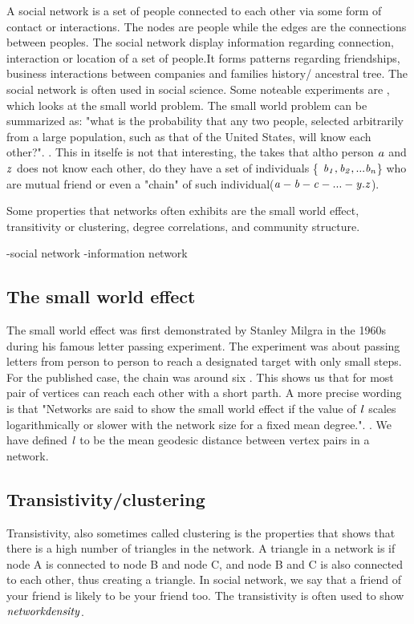 A social network is a set of people connected to each other via some form of contact or interactions\cite{ComplexNetwork2003}. The nodes are people while the edges are the connections between peoples. The social network display information regarding connection, interaction or location of a set of people.It forms patterns regarding friendships, business interactions between companies and families history/ ancestral tree. The social network is often used in social science\cite{ComplexNetwork2003}. Some noteable experiments are \cite{smallWorldExperiment}, which looks at the small world problem. The small world problem can be summarized as: "what is the probability that any two people, selected arbitrarily from a large population, such as that of the United States, will know each other?". \cite{smallworldExperiment1969}. This in itselfe is not that interesting, the \cite{SmallworldExperiment1969} takes that altho person $\it{a}$ and $\it{z}$ does not know each other, do they have a set of individuals \{ $\it {b_1, b_2, ... b_n} $\} who are mutual friend or even a "chain" of such individual($\it {a-b-c-...-y.z}$).

Some properties that networks often exhibits are the small world effect, transitivity or clustering, degree correlations, and community structure\cite{ComplexNetwork2003}.

-social network
-information network



\subsection{The small world effect}
The small world effect was first demonstrated by Stanley Milgra in the 1960s during his famous letter passing experiment\cite{SmallWorldProblemSmilgram1960}. The experiment was about passing letters from person to person to reach a designated target with only small steps. For the published case, the chain was around six \cite{Experiment1969}. This shows us that for most pair of vertices can reach each other with a short parth. A more precise wording is that "Networks are said to show the small world effect if the value of $\it{l}$ scales logarithmically or slower with the network size for a fixed mean degree.". \cite{ComplexNetwork2003}. We have defined $\it{l} $ to be the mean geodesic distance between vertex pairs in a network. 

\subsection{Transistivity/clustering}
Transistivity, also sometimes called clustering is the properties that shows that there is a high number of triangles in the network. A triangle in a network is if node A is connected to node B and node C, and node B and C is also connected to each other, thus creating a triangle. In social network, we say that a friend of your friend is likely to be your friend too\cite{ComplexNetwork2003}. The transistivity is often used to show $\it{network density}$.


